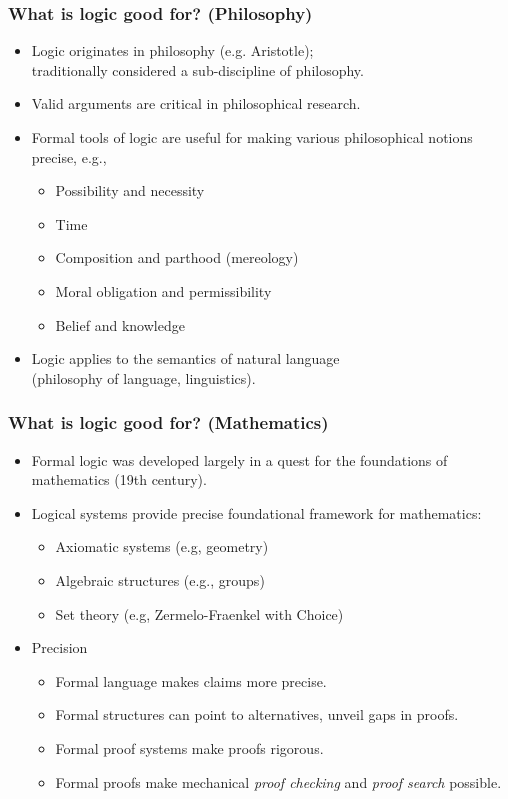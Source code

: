 \begin{frame}
  \frametitle{What is logic good for? (Philosophy)}

  \begin{itemize}[<+->]
  \item Logic originates in philosophy (e.g. Aristotle); \\ traditionally considered a sub-discipline of philosophy.
  \item Valid arguments are critical in philosophical research.
  \item Formal tools of logic are useful for making various philosophical
  notions precise, e.g.,
    \begin{itemize}[<+->]
    \item Possibility and necessity
    \item Time
    \item Composition and parthood (mereology)
    \item Moral obligation and permissibility
    \item Belief and knowledge
    \end{itemize}
  \item Logic applies to the semantics of natural language \\ (philosophy of
  language, linguistics).
  \end{itemize}
\end{frame}

\begin{frame}
  \frametitle{What is logic good for? (Mathematics)}

  \begin{itemize}[<+->]
  \item Formal logic was developed largely in a quest for the foundations of
  mathematics (19th century).
  \item Logical systems provide precise foundational framework for
  mathematics:
    \begin{itemize}[<+->]
    \item Axiomatic systems (e.g, geometry)
    \item Algebraic structures (e.g., groups)
    \item Set theory (e.g, Zermelo-Fraenkel with Choice)
    \end{itemize}
  \item Precision
    \begin{itemize}[<+->]
    \item Formal language makes claims more precise.
    \item Formal structures can point to alternatives, unveil gaps in proofs.
    \item Formal proof systems make proofs rigorous.
    \item Formal proofs make mechanical \emph{proof checking} and \emph{proof search} possible.
    \end{itemize}
  \end{itemize}

\end{frame}


